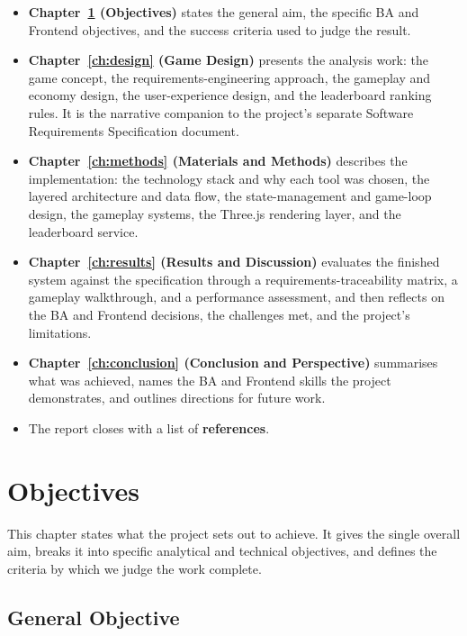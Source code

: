 \documentclass[12pt,a4paper]{report}
\begin{document}
\begin{itemize}
  \item \textbf{Chapter~\ref{ch:objectives} (Objectives)} states the general
        aim, the specific BA and Frontend objectives, and the success criteria
        used to judge the result.
  \item \textbf{Chapter~\ref{ch:design} (Game Design)} presents the analysis
        work: the game concept, the requirements-engineering approach, the
        gameplay and economy design, the user-experience design, and the
        leaderboard ranking rules. It is the narrative companion to the
        project's separate Software Requirements Specification document.
  \item \textbf{Chapter~\ref{ch:methods} (Materials and Methods)} describes the
        implementation: the technology stack and why each tool was chosen, the
        layered architecture and data flow, the state-management and game-loop
        design, the gameplay systems, the Three.js rendering layer, and the
        leaderboard service.
  \item \textbf{Chapter~\ref{ch:results} (Results and Discussion)} evaluates the
        finished system against the specification through a
        requirements-traceability matrix, a gameplay walkthrough, and a
        performance assessment, and then reflects on the BA and Frontend
        decisions, the challenges met, and the project's limitations.
  \item \textbf{Chapter~\ref{ch:conclusion} (Conclusion and Perspective)}
        summarises what was achieved, names the BA and Frontend skills the
        project demonstrates, and outlines directions for future work.
  \item The report closes with a list of \textbf{references}.
\end{itemize}

\chapter{Objectives}\label{ch:objectives}

This chapter states what the project sets out to achieve. It gives the single
overall aim, breaks it into specific analytical and technical objectives, and
defines the criteria by which we judge the work complete.

\section{General Objective}
\end{document}
